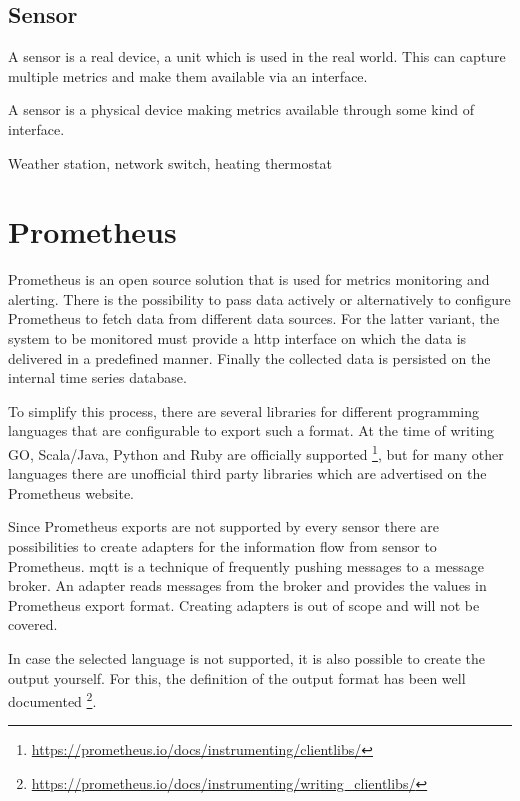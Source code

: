 \subsection{Sensor}

A sensor is a real device, a unit which is used in the real world. This can capture multiple metrics and make them available via an interface.

\begin{Definition}
	A sensor is a physical device making metrics available through some kind of interface.
\end{Definition}

\begin{Beispiel}
	Weather station, network switch, heating thermostat
\end{Beispiel}

\section{Prometheus}

Prometheus is an open source solution that is used for metrics monitoring and alerting. There is the possibility to pass data actively or alternatively to configure Prometheus to fetch data from different data sources. For the latter variant, the system to be monitored must provide a \gls{http} interface on which the data is delivered in a predefined manner. Finally the collected data is persisted on the internal time series database.

To simplify this process, there are several libraries for different programming languages that are configurable to export such a format. At the time of writing GO, Scala/Java, Python and Ruby are officially supported \footnote{\url{https://prometheus.io/docs/instrumenting/clientlibs/}}, but for many other languages there are unofficial third party libraries which are advertised on the Prometheus website. 

Since Prometheus exports are not supported by every sensor there are possibilities to create adapters for the information flow from sensor to Prometheus. \gls{mqtt} is a technique of frequently pushing messages to a message broker. An adapter reads messages from the broker and provides the values in Prometheus export format. Creating adapters is out of scope and will not be covered.

In case the selected language is not supported, it is also possible to create the output yourself. For this, the definition of the output format has been well documented \footnote{\url{https://prometheus.io/docs/instrumenting/writing_clientlibs/}}.

